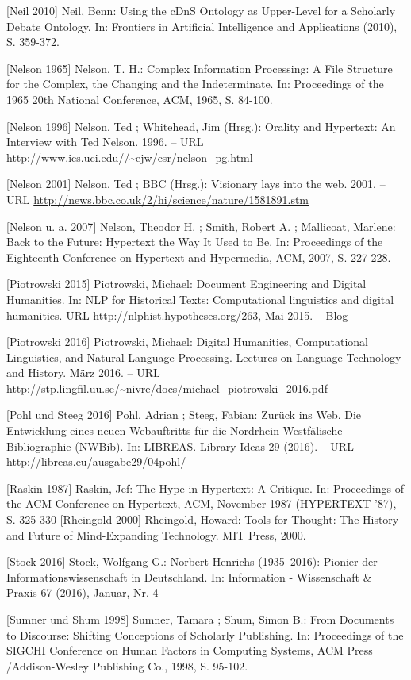 \documentclass[a4paper,
fontsize=11pt,
oneside,
numbers=noperiodatend,
parskip=half-,
bibliography=totoc,
final
]{scrartcl}
\begin{document}
{[}Neil 2010{]} Neil, Benn: Using the cDnS Ontology as Upper-Level for a
Scholarly Debate Ontology. In: Frontiers in Artificial Intelligence and
Applications (2010), S. 359-372.

{[}Nelson 1965{]} Nelson, T. H.: Complex Information Processing: A File
Structure for the Complex, the Changing and the Indeterminate. In:
Proceedings of the 1965 20th National Conference, ACM, 1965, S. 84-100.

{[}Nelson 1996{]} Nelson, Ted ; Whitehead, Jim (Hrsg.): Orality and
Hypertext: An Interview with Ted Nelson. 1996. -- URL
\url{http://www.ics.uci.edu//~ejw/csr/nelson_pg.html}

{[}Nelson 2001{]} Nelson, Ted ; BBC (Hrsg.): Visionary lays into the
web. 2001. -- URL
\url{http://news.bbc.co.uk/2/hi/science/nature/1581891.stm}

{[}Nelson u. a. 2007{]} Nelson, Theodor H. ; Smith, Robert A. ;
Mallicoat, Marlene: Back to the Future: Hypertext the Way It Used to Be.
In: Proceedings of the Eighteenth Conference on Hypertext and
Hypermedia, ACM, 2007, S. 227-228.

{[}Piotrowski 2015{]} Piotrowski, Michael: Document Engineering and
Digital Humanities. In: NLP for Historical Texts: Computational
linguistics and digital humanities. URL
\url{http://nlphist.hypotheses.org/263}, Mai 2015. -- Blog

{[}Piotrowski 2016{]} Piotrowski, Michael: Digital Humanities,
Computational Linguistics, and Natural Language Processing. Lectures on
Language Technology and History. März 2016. -- URL
http://stp.lingfil.uu.se/\textasciitilde{}nivre/docs/michael\_piotrowski\_2016.pdf

{[}Pohl und Steeg 2016{]} Pohl, Adrian ; Steeg, Fabian: Zurück ins Web.
Die Entwicklung eines neuen Webauftritts für die Nordrhein-Westfälische
Bibliographie (NWBib). In: LIBREAS. Library Ideas 29 (2016). -- URL
\url{http://libreas.eu/ausgabe29/04pohl/}

{[}Raskin 1987{]} Raskin, Jef: The Hype in Hypertext: A Critique. In:
Proceedings of the ACM Conference on Hypertext, ACM, November 1987
(HYPERTEXT '87), S. 325-330 {[}Rheingold 2000{]} Rheingold, Howard:
Tools for Thought: The History and Future of Mind-Expanding Technology.
MIT Press, 2000.

{[}Stock 2016{]} Stock, Wolfgang G.: Norbert Henrichs (1935--2016):
Pionier der Informationswissenschaft in Deutschland. In: Information -
Wissenschaft \& Praxis 67 (2016), Januar, Nr. 4

{[}Sumner und Shum 1998{]} Sumner, Tamara ; Shum, Simon B.: From
Documents to Discourse: Shifting Conceptions of Scholarly Publishing.
In: Proceedings of the SIGCHI Conference on Human Factors in Computing
Systems, ACM Press /Addison-Wesley Publishing Co., 1998, S. 95-102.
\end{document}
